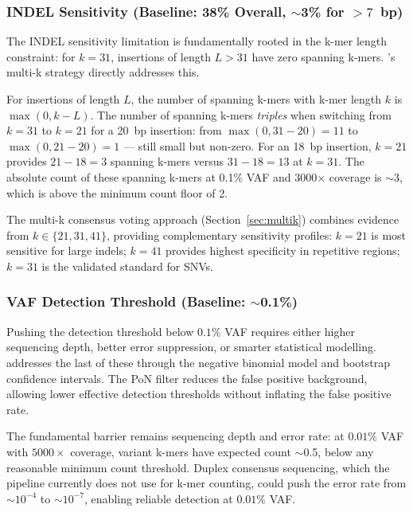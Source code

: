 \subsubsection{INDEL Sensitivity (Baseline: 38\% Overall, $\sim$3\% for $>7$~bp)}

The INDEL sensitivity limitation is fundamentally rooted in the k-mer length
constraint: for $k = 31$, insertions of length $L > 31$ have zero spanning
k-mers.  \kmerdet{}'s multi-k strategy directly addresses this.

For insertions of length $L$, the number of spanning k-mers with k-mer length
$k$ is $\max(0, k - L)$.  The number of spanning k-mers \emph{triples} when
switching from $k = 31$ to $k = 21$ for a 20~bp insertion: from
$\max(0, 31 - 20) = 11$ to $\max(0, 21 - 20) = 1$ --- still small but
non-zero.  For an 18~bp insertion, $k = 21$ provides $21 - 18 = 3$ spanning
k-mers versus $31 - 18 = 13$ at $k = 31$.  The absolute count of these spanning
k-mers at 0.1\% VAF and 3000$\times$ coverage is $\sim$3, which is above the
minimum count floor of 2.

The multi-k consensus voting approach (Section~\ref{sec:multik}) combines evidence
from $k \in \{21, 31, 41\}$, providing complementary sensitivity profiles:
$k = 21$ is most sensitive for large indels; $k = 41$ provides highest
specificity in repetitive regions; $k = 31$ is the validated standard for SNVs.

\subsubsection{VAF Detection Threshold (Baseline: $\sim$0.1\%)}

Pushing the detection threshold below $0.1\%$ VAF requires either higher
sequencing depth, better error suppression, or smarter statistical modelling.
\kmerdet{} addresses the last of these through the negative binomial model and
bootstrap confidence intervals.  The PoN filter reduces the false positive
background, allowing lower effective detection thresholds without inflating the
false positive rate.

The fundamental barrier remains sequencing depth and error rate: at $0.01\%$
VAF with $5000\times$ coverage, variant k-mers have expected count $\sim$0.5,
below any reasonable minimum count threshold.  Duplex consensus sequencing,
which the \kam{} pipeline currently does not use for k-mer counting, could push
the error rate from $\sim$$10^{-4}$ to $\sim$$10^{-7}$, enabling reliable
detection at $0.01\%$ VAF.

